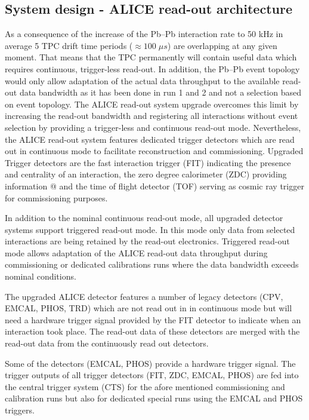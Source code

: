 


\subsection{System design - ALICE read-out architecture}

As a consequence of the increase of the Pb--Pb interaction rate to 50 kHz in average 5 TPC drift time periods ($\approx 100\; \mu s$) are overlapping at any given moment. That means that the TPC permanently will contain useful data which requires continuous, trigger-less read-out. In addition, the Pb--Pb event topology would only allow adaptation of the actual data throughput to the available read-out data bandwidth as it has been done in run 1 and 2 and not a selection based on event topology. The ALICE read-out system upgrade overcomes this limit by increasing the read-out bandwidth and registering all interactions without event selection by providing a trigger-less and continuous read-out mode. Nevertheless, the ALICE read-out system features dedicated trigger detectors which are read out in continuous mode to facilitate reconstruction and commissioning. Upgraded Trigger detectors are the fast interaction trigger (FIT) indicating the presence and centrality of an interaction, the zero degree calorimeter (ZDC) providing information @ and the time of flight detector (TOF) serving as cosmic ray trigger for commissioning purposes. 

In addition to the nominal continuous read-out mode, all upgraded detector systems support triggered read-out mode. In this mode only data from selected interactions are being retained by the read-out electronics. Triggered read-out mode allows adaptation of the ALICE read-out data throughput during commissioning or dedicated calibrations runs where the data bandwidth exceeds nominal conditions.

The upgraded ALICE detector features a number of legacy detectors (CPV, EMCAL, PHOS, TRD) which are not read out in in continuous mode but will need a hardware trigger signal provided by the FIT detector to indicate when an interaction took place. The read-out data of these detectors are merged with the read-out data from the continuously read out detectors. 

Some of the detectors (EMCAL, PHOS) provide a hardware trigger signal. The trigger outputs of all trigger detectors (FIT, ZDC, EMCAL, PHOS) are fed into the central trigger system (CTS) for the afore mentioned commissioning and calibration runs but also for dedicated special runs using the EMCAL and PHOS triggers.

